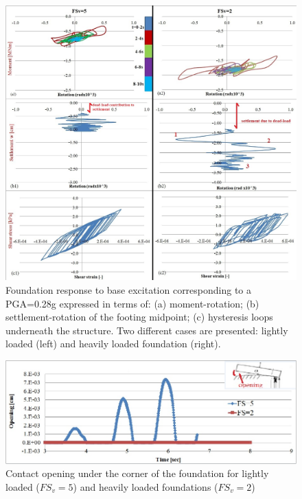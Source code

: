   \begin{figure}[!h]
  	\centering
  	\includegraphics[width=0.95\linewidth]{"eq_fs5-24m"}
  	\caption{Foundation response to base excitation corresponding to a PGA=0.28g expressed in terms of: (a) moment-rotation; (b) settlement-rotation of the footing midpoint; (c) hysteresis loops underneath the structure. Two different cases are presented: lightly loaded (left) and heavily loaded foundation (right).}
  	\label{eq1}
  \end{figure}
  
  \begin{figure}[!h]
  	\centering
  	\includegraphics[width=0.6 \linewidth]{"opening"}
  	\caption{Contact opening under the corner of the foundation for lightly loaded ($FS_v=5$) and heavily loaded foundations ($FS_v=2$)}
  	\label{opening}
  \end{figure}
 
